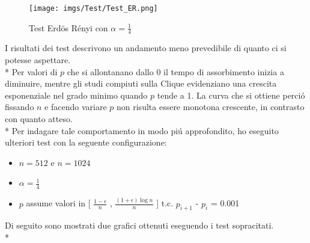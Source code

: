 \documentclass[../Tesi.tex]{subfiles}
\begin{document}
\begin{figure}[H]
    \centering
    \texttt{[image: imgs/Test/Test\_ER.png]}
    \caption*{Test Erd{\"o}s R\'enyi con $\alpha = \frac{1}{4}$}
\end{figure}
I risultati dei test descrivono un andamento meno prevedibile di quanto ci si potesse aspettare.\\*
Per valori di $p$ che si allontanano dallo 0 il tempo di assorbimento inizia a diminuire, mentre gli studi compiuti sulla Clique \cite{DBLP:journals/corr/abs-2008-13589} evidenziano una crescita esponenziale nel grado minimo quando $p$ tende a 1. La curva che si ottiene perci\'o fissando $n$ e facendo variare $p$ non risulta essere monotona crescente, in contrasto con quanto atteso.\\*
Per indagare tale comportamento in modo pi\'u approfondito, ho eseguito ulteriori test con la seguente configurazione:
\begin{itemize}
    \item $n=512$ e $n=1024$
    \item $\alpha=\frac{1}{4}$
    \item $p$ assume valori in [ $\frac{1-\epsilon}{n}$ , $\frac{{(1+\epsilon)}\log{}n}{n}$ ] t.c. $p_{i+1}$ - $p_{i}$ = 0.001
\end{itemize}
Di seguito sono mostrati due grafici ottenuti eseguendo i test sopracitati.\\*
\end{document}
